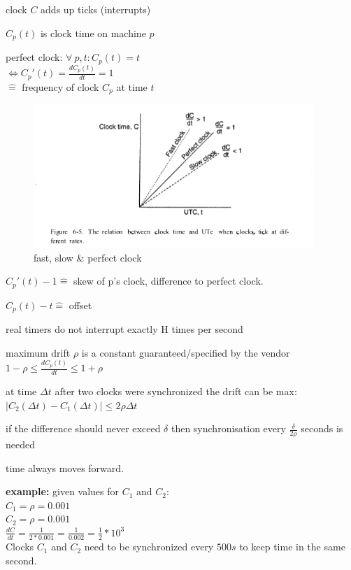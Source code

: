 \documentclass[ngerman,a4paper]{report}
\begin{document}
\begin{compactitem}
	\item clock $C$ adds up ticks (interrupts)
	\item $C_p(t)$ is clock time on machine $p$
	\item perfect clock: $\forall \  p, t : C_p(t) = t $ \\
	$\Longleftrightarrow C_p'(t) = \frac{d C_p(t)}{dt} = 1$\\
	$\mathrel{\widehat{=}}$ frequency of clock $C_p$ at time $t$
	
\begin{figure}[h]
	\centering
	\includegraphics[width=400px]{gfx/clock-drift.png}
	\caption{fast, slow \& perfect clock}
	\label{img:clock-drift}
\end{figure}	
	
	\item $C_p'(t) - 1 \mathrel{\widehat{=}}$ skew of p's clock, difference to perfect clock.
	\item $C_p(t)-t \mathrel{\widehat{=}}$ offset
	\item real timers do not interrupt exactly H times per second 
	\item maximum drift $\rho$ is a constant guaranteed/specified by the vendor \\
	$1-\rho \leq \frac{d C_p(t)}{dt} \leq 1 + \rho$
	
	\item at time $\Delta t$ after two clocks were synchronized the drift can be max: \\
	$|C_2(\Delta t) - C_1(\Delta t) | \leq 2 \rho \Delta t$
	\item if the difference should never exceed $\delta$ then synchronisation every $\frac {\delta}{2 \rho}$ seconds is needed
	\item time always moves forward.
\end{compactitem}

\textbf{example:} given values for $C_1$ and $C_2$:\\
$C_1 = \rho = 0.001$\\
$C_2 = \rho = 0.001$\\
$\frac{dC}{dt} = \frac {1}{2 * 0.001} = \frac{1}{0.002} = \frac{1}{2} * 10^{3}$\\
Clocks $C_1$ and $C_2$ need to be synchronized every $500s$ to keep time in the same second.\\
\end{document}
